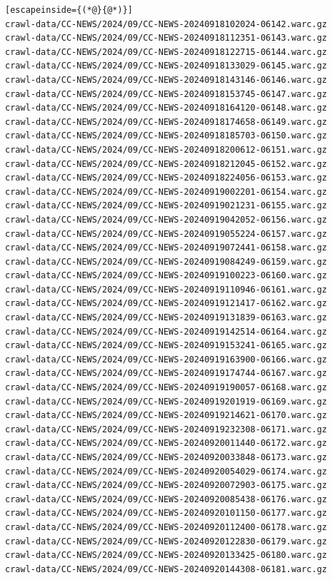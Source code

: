 \begin{lstlisting}[escapeinside={(*@}{@*)}]
crawl-data/CC-NEWS/2024/09/CC-NEWS-20240918102024-06142.warc.gz
crawl-data/CC-NEWS/2024/09/CC-NEWS-20240918112351-06143.warc.gz
crawl-data/CC-NEWS/2024/09/CC-NEWS-20240918122715-06144.warc.gz
crawl-data/CC-NEWS/2024/09/CC-NEWS-20240918133029-06145.warc.gz
crawl-data/CC-NEWS/2024/09/CC-NEWS-20240918143146-06146.warc.gz
crawl-data/CC-NEWS/2024/09/CC-NEWS-20240918153745-06147.warc.gz
crawl-data/CC-NEWS/2024/09/CC-NEWS-20240918164120-06148.warc.gz
crawl-data/CC-NEWS/2024/09/CC-NEWS-20240918174658-06149.warc.gz
crawl-data/CC-NEWS/2024/09/CC-NEWS-20240918185703-06150.warc.gz
crawl-data/CC-NEWS/2024/09/CC-NEWS-20240918200612-06151.warc.gz
crawl-data/CC-NEWS/2024/09/CC-NEWS-20240918212045-06152.warc.gz
crawl-data/CC-NEWS/2024/09/CC-NEWS-20240918224056-06153.warc.gz
crawl-data/CC-NEWS/2024/09/CC-NEWS-20240919002201-06154.warc.gz
crawl-data/CC-NEWS/2024/09/CC-NEWS-20240919021231-06155.warc.gz
crawl-data/CC-NEWS/2024/09/CC-NEWS-20240919042052-06156.warc.gz
crawl-data/CC-NEWS/2024/09/CC-NEWS-20240919055224-06157.warc.gz
crawl-data/CC-NEWS/2024/09/CC-NEWS-20240919072441-06158.warc.gz
crawl-data/CC-NEWS/2024/09/CC-NEWS-20240919084249-06159.warc.gz
crawl-data/CC-NEWS/2024/09/CC-NEWS-20240919100223-06160.warc.gz
crawl-data/CC-NEWS/2024/09/CC-NEWS-20240919110946-06161.warc.gz
crawl-data/CC-NEWS/2024/09/CC-NEWS-20240919121417-06162.warc.gz
crawl-data/CC-NEWS/2024/09/CC-NEWS-20240919131839-06163.warc.gz
crawl-data/CC-NEWS/2024/09/CC-NEWS-20240919142514-06164.warc.gz
crawl-data/CC-NEWS/2024/09/CC-NEWS-20240919153241-06165.warc.gz
crawl-data/CC-NEWS/2024/09/CC-NEWS-20240919163900-06166.warc.gz
crawl-data/CC-NEWS/2024/09/CC-NEWS-20240919174744-06167.warc.gz
crawl-data/CC-NEWS/2024/09/CC-NEWS-20240919190057-06168.warc.gz
crawl-data/CC-NEWS/2024/09/CC-NEWS-20240919201919-06169.warc.gz
crawl-data/CC-NEWS/2024/09/CC-NEWS-20240919214621-06170.warc.gz
crawl-data/CC-NEWS/2024/09/CC-NEWS-20240919232308-06171.warc.gz
crawl-data/CC-NEWS/2024/09/CC-NEWS-20240920011440-06172.warc.gz
crawl-data/CC-NEWS/2024/09/CC-NEWS-20240920033848-06173.warc.gz
crawl-data/CC-NEWS/2024/09/CC-NEWS-20240920054029-06174.warc.gz
crawl-data/CC-NEWS/2024/09/CC-NEWS-20240920072903-06175.warc.gz
crawl-data/CC-NEWS/2024/09/CC-NEWS-20240920085438-06176.warc.gz
crawl-data/CC-NEWS/2024/09/CC-NEWS-20240920101150-06177.warc.gz
crawl-data/CC-NEWS/2024/09/CC-NEWS-20240920112400-06178.warc.gz
crawl-data/CC-NEWS/2024/09/CC-NEWS-20240920122830-06179.warc.gz
crawl-data/CC-NEWS/2024/09/CC-NEWS-20240920133425-06180.warc.gz
crawl-data/CC-NEWS/2024/09/CC-NEWS-20240920144308-06181.warc.gz

\end{lstlisting}
